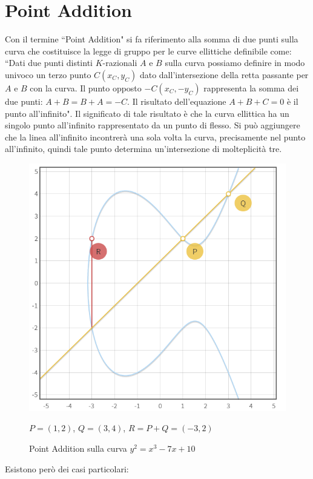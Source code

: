 \documentclass[a4paper,12pt]{tesiinfo}
\begin{document}
\section{Point Addition}
Con il termine ``Point Addition" si fa riferimento alla somma di due punti sulla curva che costituisce la legge di gruppo per le curve ellittiche definibile come: 
\\
``Dati due punti distinti $K$-razionali $A$ e $B$ sulla curva possiamo definire in modo univoco un terzo punto $C(x_C, y_C)$ dato dall'intersezione della retta passante per $A$ e $B$ con la curva. Il punto opposto $-C(x_C, -y_C)$ rappresenta la somma dei due punti: $A + B = B+ A = -C$. Il risultato dell'equazione $A+B+C = 0$ \`e il punto all'infinito". Il significato di tale risultato \`e che la curva ellittica ha un singolo punto all'infinito rappresentato da un punto di flesso. Si pu\`o aggiungere che la linea all'infinito incontrer\`a una sola volta la curva, precisamente nel punto all'infinito, quindi tale punto determina un'intersezione di molteplicit\`a tre.
\begin{figure}[H]
 \includegraphics[width=.75\textwidth,center]{PA_P+Q}
 \caption{Point Addition sulla curva $y^2 = x^3-7x+10$}
\begin{center}
  $P=(1, 2)$, $ Q=(3, 4)$, $ R=P+Q=(-3, 2)$
  \end{center}
 \end{figure}
Esistono per\`o dei casi particolari:
\end{document}
